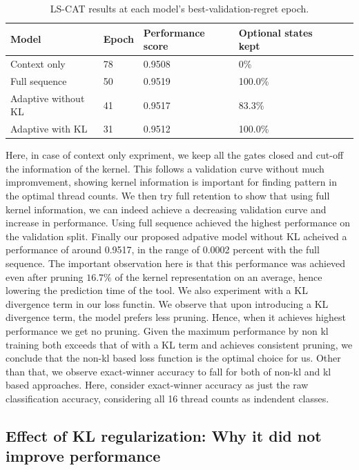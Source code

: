 \documentclass[11pt,letterpaper]{article}
\begin{document}
\begin{table}[H]
\centering\small
\caption{LS-CAT results at each model's best-validation-regret epoch.}
\begin{tabularx}{\linewidth}{@{}L{.24\linewidth}YYYYY@{}}
\toprule
\textbf{Model} & \textbf{Epoch} & \textbf{Performance score} & \textbf{Optional states kept} \\
\midrule
Context only & 78 & 0.9508 & 0\% \\
Full sequence & 50 & 0.9519 & 100.0\% \\
Adaptive without KL & 41 & 0.9517 & 83.3\% \\
Adaptive with KL & 31 & 0.9512 & 100.0\% \\
\bottomrule
\end{tabularx}
\end{table}

Here, in case of context only expriment, we keep all the gates closed and cut-off the information of the kernel. This follows a validation curve without much impromvement, showing kernel information is important for finding pattern in the optimal thread counts.
We then try full retention to show that using full kernel information, we can indeed achieve a decreasing validation curve and increase in performance. Using full sequence achieved the highest performance on the validation split.
Finally our proposed adpative model without KL acheived a performance of around 0.9517, in the range of 0.0002 percent with the full sequence. The important observation here is that
this performance was achieved even after pruning $16.7\%$ of the kernel representation on an average, hence lowering the prediction time of the tool.
We also experiment with a KL divergence term in our loss functin. We observe that upon introducing a KL divergence term, the model prefers less pruning. Hence, when it achieves highest performance
we get no pruning. Given the maximum performance by non kl training both exceeds that of with a KL term and achieves consistent pruning, we conclude that the non-kl based loss function is the optimal choice for us.
Other than that, we observe exact-winner accuracy to fall for both of non-kl and kl based approaches. Here, consider exact-winner accuracy as just the raw classification accuracy, considering all 16 thread counts as indendent classes.

\subsection{Effect of KL regularization: Why it did not improve performance}
\end{document}
